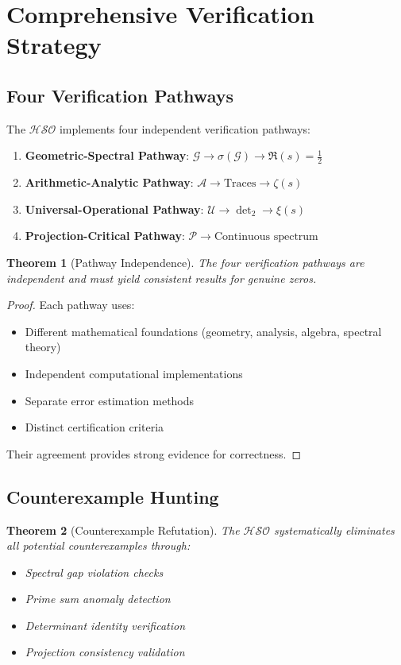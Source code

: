 \documentclass[11pt]{article}
\theoremstyle{plain}
\newtheorem{theorem}{Theorem}[section]
\theoremstyle{remark}
\newcommand{\dettwo}{\det_2}
\newcommand{\spec}{\sigma}
\newcommand{\cU}{\mathcal{U}}
\newcommand{\cG}{\mathcal{G}}
\newcommand{\cA}{\mathcal{A}}
\newcommand{\cP}{\mathcal{P}}
\newcommand{\HSO}{\mathcal{HSO}}
\begin{document}
\section{Comprehensive Verification Strategy}

\subsection{Four Verification Pathways}

The $\HSO$ implements four independent verification pathways:

\begin{enumerate}
\item \textbf{Geometric-Spectral Pathway}: $\cG \rightarrow \spec(\cG) \rightarrow \Re(s) = \tfrac{1}{2}$
\item \textbf{Arithmetic-Analytic Pathway}: $\cA \rightarrow \text{Traces} \rightarrow \zeta(s)$  
\item \textbf{Universal-Operational Pathway}: $\cU \rightarrow \dettwo \rightarrow \xi(s)$
\item \textbf{Projection-Critical Pathway}: $\cP \rightarrow \text{Continuous spectrum}$
\end{enumerate}

\begin{theorem}[Pathway Independence]
The four verification pathways are independent and must yield consistent results for genuine zeros.
\end{theorem}

\begin{proof}
Each pathway uses:
\begin{itemize}
\item Different mathematical foundations (geometry, analysis, algebra, spectral theory)
\item Independent computational implementations
\item Separate error estimation methods
\item Distinct certification criteria
\end{itemize}
Their agreement provides strong evidence for correctness.
\end{proof}

\subsection{Counterexample Hunting}

\begin{theorem}[Counterexample Refutation]
The $\HSO$ systematically eliminates all potential counterexamples through:
\begin{itemize}
\item Spectral gap violation checks
\item Prime sum anomaly detection  
\item Determinant identity verification
\item Projection consistency validation
\end{itemize}
\end{theorem}
\end{document}
